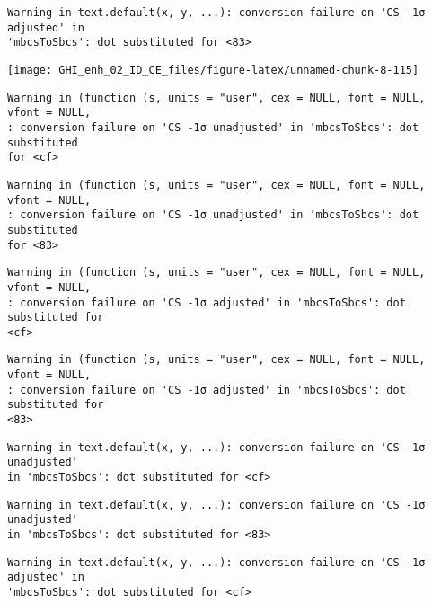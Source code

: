 \documentclass[
  10pt,
  a4paper,oneside]{article}
\begin{document}
\begin{verbatim}
Warning in text.default(x, y, ...): conversion failure on 'CS -1σ adjusted' in
'mbcsToSbcs': dot substituted for <83>
\end{verbatim}

\begin{center}\texttt{[image: GHI\_enh\_02\_ID\_CE\_files/figure-latex/unnamed-chunk-8-115]} \end{center}

\begin{verbatim}
Warning in (function (s, units = "user", cex = NULL, font = NULL, vfont = NULL,
: conversion failure on 'CS -1σ unadjusted' in 'mbcsToSbcs': dot substituted
for <cf>
\end{verbatim}

\begin{verbatim}
Warning in (function (s, units = "user", cex = NULL, font = NULL, vfont = NULL,
: conversion failure on 'CS -1σ unadjusted' in 'mbcsToSbcs': dot substituted
for <83>
\end{verbatim}

\begin{verbatim}
Warning in (function (s, units = "user", cex = NULL, font = NULL, vfont = NULL,
: conversion failure on 'CS -1σ adjusted' in 'mbcsToSbcs': dot substituted for
<cf>
\end{verbatim}

\begin{verbatim}
Warning in (function (s, units = "user", cex = NULL, font = NULL, vfont = NULL,
: conversion failure on 'CS -1σ adjusted' in 'mbcsToSbcs': dot substituted for
<83>
\end{verbatim}

\begin{verbatim}
Warning in text.default(x, y, ...): conversion failure on 'CS -1σ unadjusted'
in 'mbcsToSbcs': dot substituted for <cf>
\end{verbatim}

\begin{verbatim}
Warning in text.default(x, y, ...): conversion failure on 'CS -1σ unadjusted'
in 'mbcsToSbcs': dot substituted for <83>
\end{verbatim}

\begin{verbatim}
Warning in text.default(x, y, ...): conversion failure on 'CS -1σ adjusted' in
'mbcsToSbcs': dot substituted for <cf>
\end{verbatim}
\end{document}
